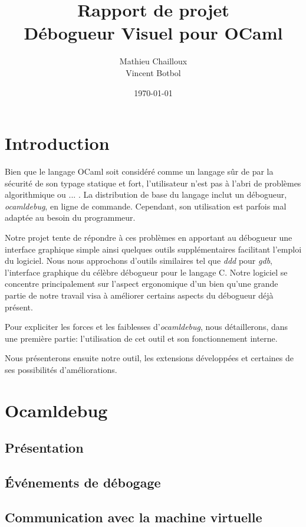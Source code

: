 \documentclass[11pt,a4paper]{report}
\title{Rapport de projet\\Débogueur Visuel pour OCaml}
\author{Mathieu Chailloux\\Vincent Botbol}
\date\today
\begin{document}
\maketitle

\chapter{Introduction}

Bien que le langage OCaml soit considéré comme un langage sûr de par la sécurité de son typage statique et fort, %
l'utilisateur n'est pas à l'abri de problèmes algorithmique ou ... . La distribution de base du langage inclut %
un débogueur, \emph{ocamldebug}, en ligne de commande. Cependant, son utilisation est parfois mal adaptée au besoin du programmeur.

Notre projet tente de répondre à ces problèmes en apportant au débogueur une interface graphique simple ainsi quelques
outils supplémentaires facilitant l'emploi du logiciel. Nous nous approchons d'outils similaires
tel que \emph{ddd} pour \emph{gdb}, l'interface graphique du célèbre débogueur pour le langage C. Notre logiciel se concentre
principalement sur l'aspect ergonomique d'un  bien qu'une grande partie de notre travail visa à améliorer certains
aspects du débogueur déjà présent.

Pour expliciter les forces et les faiblesses d'\emph{ocamldebug}, nous détaillerons, dans une première partie:
l'utilisation de cet outil et son fonctionnement interne.

Nous présenterons ensuite notre outil, les extensions développées et certaines de ses possibilités d'améliorations.

\chapter{Ocamldebug}

\section{Présentation}


\section{\'Evénements de débogage}
\section{Communication avec la machine virtuelle}
\end{document}
